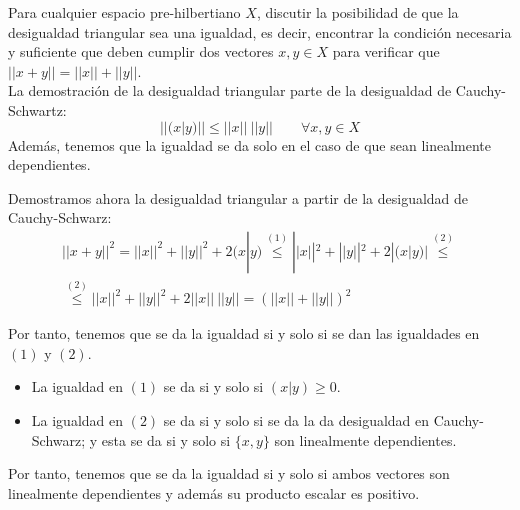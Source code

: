 \begin{ejercicio}
    Para cualquier espacio pre-hilbertiano $X$, discutir la posibilidad de que la desigualdad triangular sea una igualdad, es decir, encontrar la condición necesaria y suﬁciente que deben cumplir dos vectores $x, y \in X$ para veriﬁcar que $|| x + y|| =|| x|| + ||y||$.\\

    La demostración de la desigualdad triangular parte de la desigualdad de Cauchy-Schwartz: $$||(x|y)|| \leq ||x||~||y|| \qquad \forall x,y\in X$$
    Además, tenemos que la igualdad se da solo en el caso de que sean linealmente dependientes.

    Demostramos ahora la desigualdad triangular a partir de la desigualdad de Cauchy-Schwarz:
    \begin{multline*}
        ||x+y||^2 = ||x||^2 + ||y||^2 + 2(x|y) \stackrel{(1)}{\leq}
        ||x||^2 + ||y||^2 + 2|(x|y)| \stackrel{(2)}{\leq} \\
        \stackrel{(2)}{\leq}
        ||x||^2 + ||y||^2 + 2||x||~||y|| = \left(||x|| + ||y||\right)^2
    \end{multline*}
    
    
    Por tanto, tenemos que se da la igualdad si y solo si se dan las igualdades en $(1)$ y $(2)$.
    \begin{itemize}
        \item La igualdad en $(1)$ se da si y solo si $(x|y)\geq 0$.
        \item La igualdad en $(2)$ se da si y solo si se da la da desigualdad en Cauchy-Schwarz; y esta se da si y solo si $\{x,y\}$ son linealmente dependientes.
    \end{itemize}
    
    Por tanto, tenemos que se da la igualdad si y solo si ambos vectores son linealmente dependientes y además su producto escalar es positivo.
\end{ejercicio}

